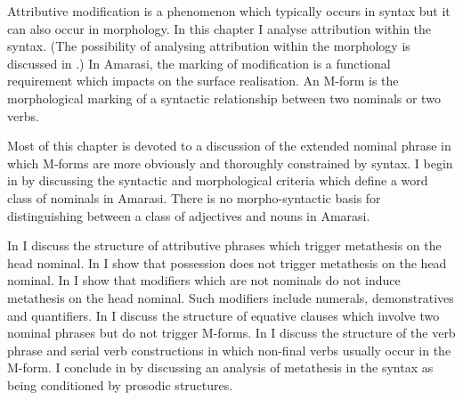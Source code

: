 Attributive modification is a phenomenon which typically
occurs in syntax but it can also occur in morphology.
In this chapter I analyse attribution within the syntax.
(The possibility of analysing attribution within the morphology is discussed in .)
In Amarasi, the marking of modification is a functional requirement
which impacts on the surface realisation.
An M-form is the morphological marking of
a syntactic relationship between two nominals or two verbs.

\begin{multicols}{2}
	\begin{exe}
		\label{tr:ExtNom}
		\label{tr:VerPhr}
	\end{exe}
\end{multicols}

Most of this chapter is devoted to a discussion of the extended
nominal phrase in which M-forms are more obviously and thoroughly constrained by syntax.
I begin in  by discussing the
syntactic and morphological criteria which
define a word class of nominals in Amarasi.
There is no morpho-syntactic basis for distinguishing
between a class of adjectives and nouns in Amarasi.

In  I discuss the structure of attributive phrases
which trigger metathesis on the head nominal.
In  I show that possession
does not trigger metathesis on the head nominal.
In  I show that modifiers which are not nominals
do not induce metathesis on the head nominal.
Such modifiers include numerals, demonstratives and quantifiers.
In  I discuss the structure
of equative clauses which involve two nominal phrases but do not trigger M-forms.
In  I discuss the structure
of the verb phrase and serial verb constructions
in which non-final verbs usually occur in the M-form.
I conclude in  by discussing an analysis
of metathesis in the syntax as being conditioned by prosodic structures.